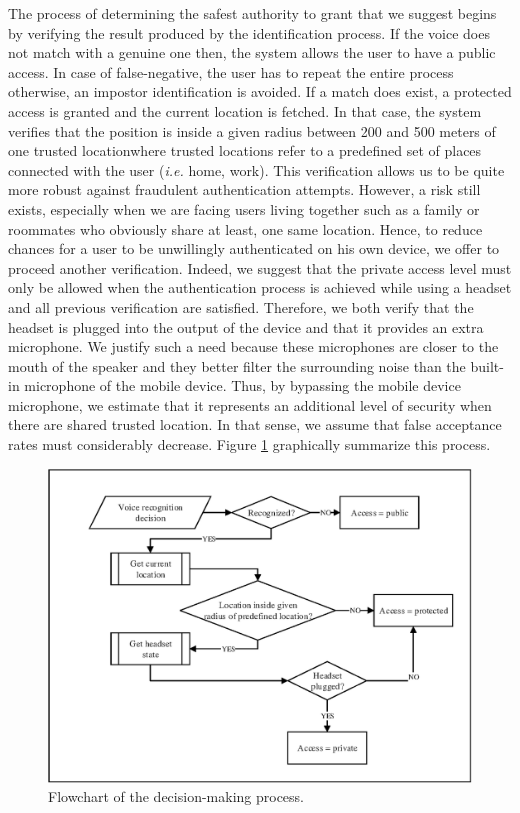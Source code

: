 \documentclass[cryptography,article,submit,moreauthors,pdftex,10pt,a4paper]{mdpi}
\begin{document}
The process of determining the safest authority to grant that we suggest begins by verifying the result produced by the identification process. If the voice does not match with a genuine one then, the system allows the user to have a public access. In case of false-negative, the user has to repeat the entire process otherwise, an impostor identification is avoided. If a match does exist, a protected access is granted and the current location is fetched. In that case, the system verifies that the position is inside a given radius between 200 and 500 meters of one trusted location\textemdash where trusted locations refer to a predefined set of places connected with the user (\textit{i.e.} home, work). This verification allows us to be quite more robust against fraudulent authentication attempts. However, a risk still exists, especially when we are facing users living together such as a family or roommates who obviously share at least, one same location. Hence, to reduce chances for a user to be unwillingly authenticated on his own device, we offer to proceed another verification. Indeed, we suggest that the private access level must only be allowed when the authentication process is achieved while using a headset and all previous verification are satisfied. Therefore, we both verify that the headset is plugged into the output of the device and that it provides an extra microphone. We justify such a need because these microphones are closer to the mouth of the speaker and they better filter the surrounding noise than the built-in microphone of the mobile device. Thus, by bypassing the mobile device microphone, we estimate that it represents an additional level of security when there are shared trusted location. In that sense, we assume that false acceptance rates must considerably decrease. Figure \ref{fig:6} graphically summarize this process.

\begin{figure}[H]
	\centering
	\includegraphics[width=10 cm]{6.eps}
	\caption{Flowchart of the decision-making process.}
	\label{fig:6}
\end{figure}
\end{document}

